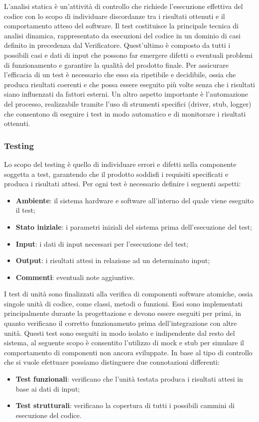 L'analisi statica è un'attività di controllo che richiede l'esecuzione effettiva del codice con lo scopo di
individuare discordanze tra i risultati ottenuti e il comportamento atteso del software. Il test costituisce
la principale tecnica di analisi dinamica, rappresentato da esecuzioni del codice in un dominio di casi definito in precedenza dal Verificatore.
Quest'ultimo è composto da tutti i possibili casi e dati di input che possono far emergere difetti o eventuali problemi di funzionamento e
garantire la qualità del prodotto finale. Per assicurare l'efficacia di un test è necessario
che esso sia ripetibile e decidibile, ossia che produca risultati coerenti e che possa essere eseguito più volte senza che
i risultati siano influenzati da fattori esterni. Un altro aspetto importante è l'automazione del processo, realizzabile tramite l'uso di
strumenti specifici (driver, stub, logger) che consentono di eseguire i test in modo automatico e di monitorare i risultati ottenuti.

\subsubsection{Testing} \label{testing}
Lo scopo del testing è quello di individuare errori e difetti nella componente soggetta a test,
garantendo che il prodotto soddisfi i requisiti specificati e produca i risultati attesi. Per ogni test
è necessario definire i seguenti aspetti:
\begin{itemize}
	\item \textbf{Ambiente}: il sistema hardware e software all'interno del quale viene eseguito il test;
	\item \textbf{Stato iniziale}: i parametri iniziali del sistema prima dell'esecuzione del test;
	\item \textbf{Input}: i dati di input necessari per l'esecuzione del test;
	\item \textbf{Output}: i risultati attesi in relazione ad un determinato input;
	\item \textbf{Commenti}: eventuali note aggiuntive.
\end{itemize}

I test di unità sono finalizzati alla verifica di componenti software
atomiche, ossia singole unità di codice, come classi, metodi o funzioni. Essi sono implementati principalmente durante la progettazione e
devono essere eseguiti per primi, in quanto verificano il corretto funzionamento prima dell'integrazione con altre unità. Questi
test sono eseguiti in modo isolato e indipendente dal resto del sistema,
al seguente scopo è consentito l'utilizzo di mock e stub per simulare il comportamento di componenti non ancora sviluppate. In base al tipo
di controllo che si vuole efettuare possiamo distinguere due connotazioni differenti:
\begin{itemize}
	\item \textbf{Test funzionali}: verificano che l'unità testata produca i risultati attesi in base ai dati di input;
	\item \textbf{Test strutturali}: verificano la copertura di tutti i possibili cammini di esecuzione del codice.
\end{itemize}

